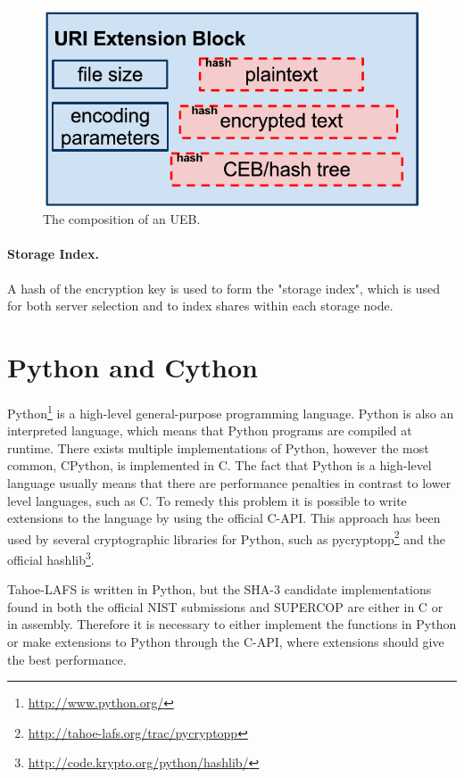 \documentclass[english,12pt,a4paper]{book}
\begin{document}
\begin{figure}[!h]
    \centering
    \includegraphics[width=0.9\columnwidth]{Tahoe-UEB.pdf}
    \caption{The composition of an \ac{UEB}.}
    \label{fig:tahoeueb}
\end{figure}

\paragraph{Storage Index.}

A hash of the encryption key is used to form the "storage index", which is
used for both server selection and to index shares within each storage node.

\section{Python and Cython}
Python\footnote{\url{http://www.python.org/}} is a high-level general-purpose
programming language. Python is also an interpreted language, which means that
Python programs are compiled at runtime. There exists multiple implementations
of Python, however the most common, CPython, is implemented in C. The fact that
Python is a high-level language usually means that there are performance
penalties in contrast to lower level languages, such as C. To remedy this
problem it is possible to write extensions to the language by using the official
C-API. This approach has been used by several cryptographic libraries for
Python, such as pycryptopp\footnote{\url{http://tahoe-lafs.org/trac/pycryptopp}}
and the official hashlib\footnote{\url{http://code.krypto.org/python/hashlib/}}.

Tahoe-\ac{LAFS} is written in Python, but the SHA-3 candidate implementations found
in both the official NIST submissions and SUPERCOP are either in C or in
assembly. Therefore it is necessary to either implement the functions in Python
or make extensions to Python through the C-API, where extensions should give
the best performance.
\end{document}
